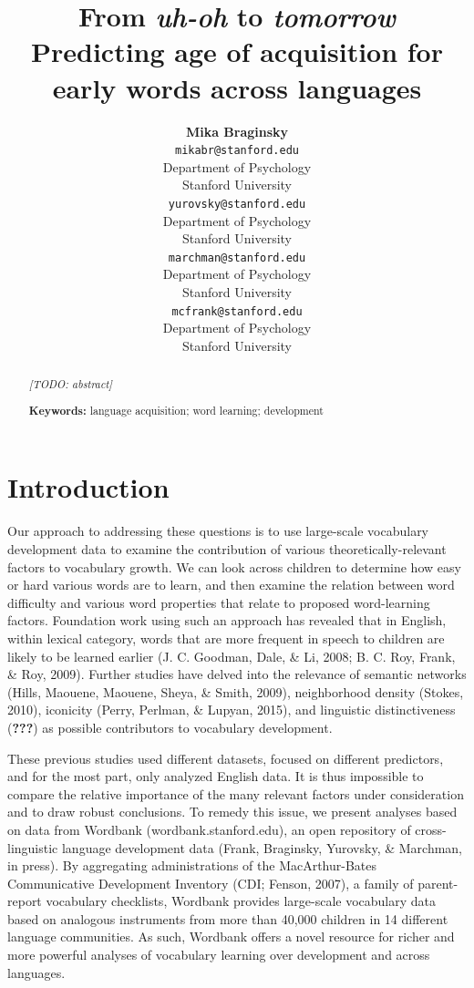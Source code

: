 \documentclass[10pt, letterpaper]{article}
\title{From \emph{uh-oh} to \emph{tomorrow}\\Predicting age of acquisition for
early words across languages}
\author{{\large \bf Mika Braginsky} \\ \texttt{mikabr@stanford.edu} \\ Department of Psychology \\ Stanford University \And {\large \bf Daniel Yurovsky} \\ \texttt{yurovsky@stanford.edu} \\ Department of Psychology \\ Stanford University \And {\large \bf Virginia A. Marchman} \\ \texttt{marchman@stanford.edu} \\ Department of Psychology \\ Stanford University \And {\large \bf Michael C. Frank} \\ \texttt{mcfrank@stanford.edu} \\ Department of Psychology \\ Stanford University}
\begin{document}
\maketitle

\begin{abstract}
\emph{{[}TODO: abstract{]}}

\textbf{Keywords:}
language acquisition; word learning; development
\end{abstract}

\section{Introduction}\label{introduction}

Our approach to addressing these questions is to use large-scale
vocabulary development data to examine the contribution of various
theoretically-relevant factors to vocabulary growth. We can look across
children to determine how easy or hard various words are to learn, and
then examine the relation between word difficulty and various word
properties that relate to proposed word-learning factors. Foundation
work using such an approach has revealed that in English, within lexical
category, words that are more frequent in speech to children are likely
to be learned earlier (J. C. Goodman, Dale, \& Li, 2008; B. C. Roy,
Frank, \& Roy, 2009). Further studies have delved into the relevance of
semantic networks (Hills, Maouene, Maouene, Sheya, \& Smith, 2009),
neighborhood density (Stokes, 2010), iconicity (Perry, Perlman, \&
Lupyan, 2015), and linguistic distinctiveness ({\textbf{???}}) as
possible contributors to vocabulary development.

These previous studies used different datasets, focused on different
predictors, and for the most part, only analyzed English data. It is
thus impossible to compare the relative importance of the many relevant
factors under consideration and to draw robust conclusions. To remedy
this issue, we present analyses based on data from Wordbank
(wordbank.stanford.edu), an open repository of cross-linguistic language
development data (Frank, Braginsky, Yurovsky, \& Marchman, in press). By
aggregating administrations of the MacArthur-Bates Communicative
Development Inventory (CDI; Fenson, 2007), a family of parent-report
vocabulary checklists, Wordbank provides large-scale vocabulary data
based on analogous instruments from more than 40,000 children in 14
different language communities. As such, Wordbank offers a novel
resource for richer and more powerful analyses of vocabulary learning
over development and across languages.
\end{document}
